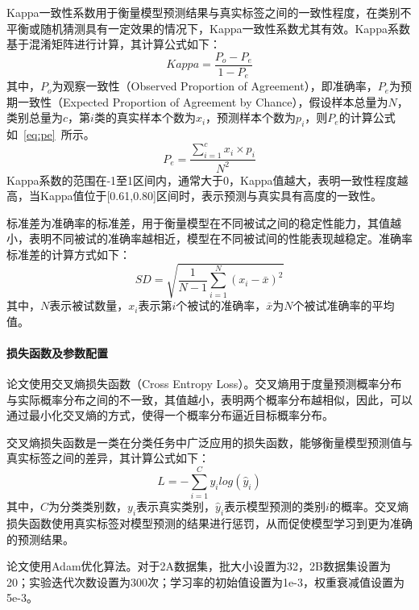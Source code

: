Kappa一致性系数用于衡量模型预测结果与真实标签之间的一致性程度，在类别不平衡或随机猜测具有一定效果的情况下，Kappa一致性系数尤其有效。Kappa系数基于混淆矩阵进行计算，其计算公式如下：
\begin{equation}\label{eq:kappa}
    Kappa=\frac{P_o-P_e}{1-P_e}
\end{equation}
其中，\(P_o\)为观察一致性（Observed Proportion of Agreement），即准确率，\(P_e\)为预期一致性（Expected Proportion of Agreement by Chance），假设样本总量为\(N\)，类别总量为\(c\)，第\(i\)类的真实样本个数为\(x_i\)，预测样本个数为\(p_i\)，则\(P_e\)的计算公式如~\ref{eq:pe}~所示。
\begin{equation}\label{eq:pe}
    P_e=\frac{\sum_{i=1}^{c}x_i \times p_i }{N^{2} } 
\end{equation}
Kappa系数的范围在-1至1区间内，通常大于0，Kappa值越大，表明一致性程度越高，当Kappa值位于[0.61,0.80]区间时，表示预测与真实具有高度的一致性。

标准差为准确率的标准差，用于衡量模型在不同被试之间的稳定性能力，其值越小，表明不同被试的准确率越相近，模型在不同被试间的性能表现越稳定。准确率标准差的计算方式如下：
\begin{equation}
    SD=\sqrt{\frac{1}{N-1}  \sum_{i=1}^{N}(x_i-\bar{x} )^{2} } 
    \label{eq:sd}
\end{equation}
其中，\(N\)表示被试数量，\(x_i\)表示第\(i\)个被试的准确率，\(\bar{x}\)为\(N\)个被试准确率的平均值。

\paragraph{损失函数及参数配置}

论文使用交叉熵损失函数（Cross Entropy Loss）。交叉熵用于度量预测概率分布与实际概率分布之间的不一致，其值越小，表明两个概率分布越相似，因此，可以通过最小化交叉熵的方式，使得一个概率分布逼近目标概率分布。

交叉熵损失函数是一类在分类任务中广泛应用的损失函数，能够衡量模型预测值与真实标签之间的差异，其计算公式如下：
\begin{equation}
    L= -\sum_{i=1}^{C}y_i log(\hat{y}_i )
    \label{eq:loss}
\end{equation}
其中，\(C\)为分类类别数，\(y_i\)表示真实类别，\(\hat{y}_i\)表示模型预测的类别\(i\)的概率。交叉熵损失函数使用真实标签对模型预测的结果进行惩罚，从而促使模型学习到更为准确的预测结果。

论文使用Adam优化算法。对于2A数据集，批大小设置为32，2B数据集设置为20；实验迭代次数设置为300次；学习率的初始值设置为1e-3，权重衰减值设置为5e-3。

